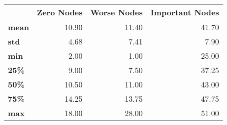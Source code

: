 \begin{tabular}{lrrr}
\toprule
{} &  Zero Nodes &  Worse Nodes &  Important Nodes \\
\midrule
\textbf{mean} &       10.90 &        11.40 &            41.70 \\
\textbf{std } &        4.68 &         7.41 &             7.90 \\
\textbf{min } &        2.00 &         1.00 &            25.00 \\
\textbf{25\% } &        9.00 &         7.50 &            37.25 \\
\textbf{50\% } &       10.50 &        11.00 &            43.00 \\
\textbf{75\% } &       14.25 &        13.75 &            47.75 \\
\textbf{max } &       18.00 &        28.00 &            51.00 \\
\bottomrule
\end{tabular}
